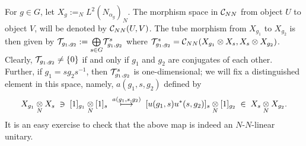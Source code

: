 For $ g \in G $, let $ X_g := _N L^2 (N_{\alpha_g})_N$.
The morphism space in $ \mathcal C_{NN} $ from object $ U $ to object $ V $, will be denoted by $ \mathcal C_{NN} (U,V) $.
The tube morphism from $ X_{g_1} $ to $ X_{g_2} $ is then given by $ \mathcal T_{g_1, g_2} := \underset{s\in G}{\bigoplus} \mathcal T^s_{g_1,g_2}$ where $\mathcal T^s_{g_1,g_2} = \mathcal C_{NN} (X_{g_1} \otimes X_s , X_s \otimes X_{g_2}  )$.
Clearly, $ \mathcal T_{g_1,g_2}  \neq \{0\}$ if and only if $ g_1 $ and $ g_2 $ are conjugates of each other.
Further, if $ g_1 = s g_2 s^{-1} $, then $ \mathcal T^s_{g_1, g_2} $ is one-dimensional; we will fix a distinguished element in this space, namely, $ a(g_1 , s , g_2) $ defined by
\[
X_{g_1} \underset{N}{\otimes} X_s \; \ni \; [1]_{g_1} \underset{N}{\otimes} [1]_s \; \overset{a(g_1,s,g_2)}{\longmapsto} \; [u(g_1 , s) u^*(s, g_2)]_s \underset{N}{\otimes} [1]_{g_2} \; \in \; X_s \underset{N}{\otimes} X_{g_2}.
\]
It is an easy exercise to check that the above map is indeed an $ N $-$ N $-linear unitary.

